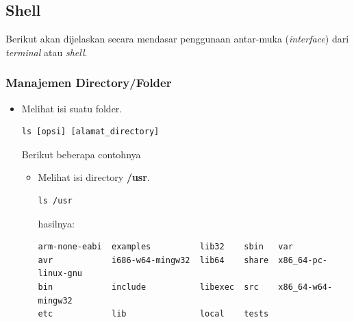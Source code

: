 \documentclass[12pt,]{article}
\begin{document}
	\subsection{Shell}
	Berikut akan dijelaskan secara mendasar penggunaan antar-muka (\textit{interface}) dari \textit{terminal} atau \textit{shell}.
	\subsubsection{Manajemen Directory/Folder}
	\begin{itemize}
		\item Melihat isi suatu folder.
		\begin{verbatim}
ls [opsi] [alamat_directory]
		\end{verbatim}
		Berikut beberapa contohnya
		\begin{itemize}
			\item Melihat isi directory \textbf{/usr}.
			\begin{verbatim}
ls /usr
			\end{verbatim}
			hasilnya:
			\begin{verbatim}
arm-none-eabi  examples          lib32    sbin   var
avr            i686-w64-mingw32  lib64    share  x86_64-pc-linux-gnu
bin            include           libexec  src    x86_64-w64-mingw32
etc            lib               local    tests
			\end{verbatim}
			

\end{itemize}
\end{itemize}
\end{document}
